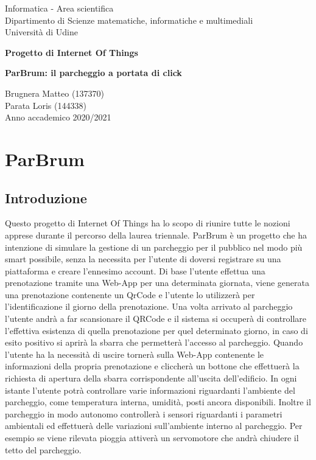 \documentclass[a4paper,11pt]{report}
\begin{document}
\begin{titlepage}
\BgThispage

  \clearpage\thispagestyle{empty}
  \centering
  \vspace{2cm}
  {\normalsize Informatica - Area scientifica \\  Dipartimento di Scienze matematiche, informatiche e multimediali\\  Università di Udine \par}
  \vspace{8cm}
  {\Huge \textbf{  Progetto di Internet Of Things \newline \newline }

\LARGE{\textbf{ParBrum: il parcheggio a portata di click}}
  }

  \vspace{2cm}
  {\Large  Brugnera Matteo (137370) \\ Parata Loris (144338)\\ }
  \vspace{9cm}
  {\normalsize Anno accademico 2020/2021}
  \pagebreak
\end{titlepage}

\tableofcontents{}
\pagebreak
\chapter{ParBrum}
\section{Introduzione}
Questo progetto di Internet Of Things ha lo scopo di riunire tutte le nozioni apprese durante il percorso della laurea triennale. ParBrum è un progetto che ha intenzione di simulare la gestione di un parcheggio per il pubblico nel modo più smart possibile, senza la necessita per l'utente di doversi registrare su una piattaforma e creare l'ennesimo account. \newline
Di base l'utente effettua una prenotazione tramite una Web-App per una determinata giornata, viene generata una prenotazione contenente un QrCode e l'utente lo utilizzerà per l'identificazione il giorno della prenotazione. Una volta arrivato al parcheggio l'utente andrà a far scansionare il QRCode e il sistema si occuperà di controllare l'effettiva esistenza di quella prenotazione per quel determinato giorno, in caso di esito positivo  si aprirà la sbarra che permetterà l'accesso al parcheggio. Quando l'utente ha la necessità di uscire tornerà sulla Web-App contenente le informazioni della propria prenotazione e cliccherà un bottone che effettuerà la richiesta di apertura della sbarra corrispondente all'uscita dell'edificio.\newline
In ogni istante l'utente potrà controllare varie informazioni riguardanti l'ambiente del parcheggio, come temperatura interna, umidità, posti ancora disponibili. Inoltre il parcheggio in modo autonomo controllerà i sensori riguardanti i parametri ambientali ed effettuerà delle variazioni sull'ambiente interno al parcheggio. Per esempio se viene rilevata pioggia attiverà un servomotore che andrà chiudere il tetto del parcheggio.
\end{document}
